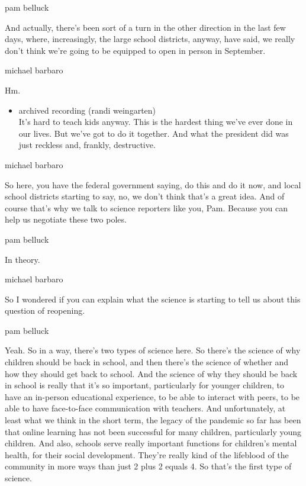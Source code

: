 pam belluck

And actually, there's been sort of a turn in the other direction in the
last few days, where, increasingly, the large school districts, anyway,
have said, we really don't think we're going to be equipped to open in
person in September.

michael barbaro

Hm.

\begin{itemize}
\tightlist
\item
  archived recording (randi weingarten)\\
  It's hard to teach kids anyway. This is the hardest thing we've ever
  done in our lives. But we've got to do it together. And what the
  president did was just reckless and, frankly, destructive.
\end{itemize}

michael barbaro

So here, you have the federal government saying, do this and do it now,
and local school districts starting to say, no, we don't think that's a
great idea. And of course that's why we talk to science reporters like
you, Pam. Because you can help us negotiate these two poles.

pam belluck

In theory.

michael barbaro

So I wondered if you can explain what the science is starting to tell us
about this question of reopening.

pam belluck

Yeah. So in a way, there's two types of science here. So there's the
science of why children should be back in school, and then there's the
science of whether and how they should get back to school. And the
science of why they should be back in school is really that it's so
important, particularly for younger children, to have an in-person
educational experience, to be able to interact with peers, to be able to
have face-to-face communication with teachers. And unfortunately, at
least what we think in the short term, the legacy of the pandemic so far
has been that online learning has not been successful for many children,
particularly young children. And also, schools serve really important
functions for children's mental health, for their social development.
They're really kind of the lifeblood of the community in more ways than
just 2 plus 2 equals 4. So that's the first type of science.

